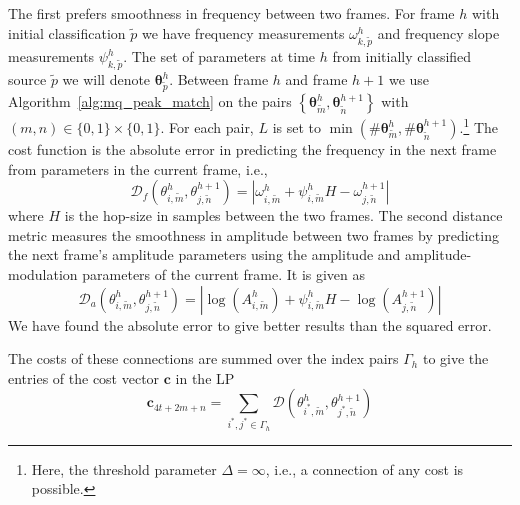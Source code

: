 The first prefers
smoothness in frequency between two frames. For frame $h$ with initial
classification $\tilde{p}$ we have frequency measurements
$\omega_{k,\tilde{p}}^{h}$
and frequency slope measurements $\psi_{k,\tilde{p}}^{h}$. The set of parameters
at time $h$ from initially classified source $\tilde{p}$ we will denote
$\boldsymbol{\theta}_{\tilde{p}}^{h}$. Between frame $h$ and frame $h+1$ we use
Algorithm~\ref{alg:mq_peak_match} on the pairs $\left\{ \boldsymbol{\theta}_{\tilde{m}}^{h},
\boldsymbol{\theta}_{\tilde{n}}^{h+1} \right\}$ with $(m,n) \in \{0,1\} \times
\{0,1\}$. For
each pair, $L$ is set to $\min(\# \boldsymbol{\theta}_{\tilde{m}}^{h} ,
\# \boldsymbol{\theta}_{\tilde{n}}^{h+1}).$\footnote{Here, the threshold parameter $\Delta
= \infty$, i.e., a connection of any cost is possible.} The cost function is the absolute error
in predicting the frequency in the next frame from parameters in the current
frame, i.e.,
\[
    \mathcal{D}_{f} \left( \theta_{i,\tilde{m}}^{h},
    \theta_{j,\tilde{n}}^{h+1} \right) = | \omega_{i,\tilde{m}}^{h} +
    \psi_{i,\tilde{m}}^{h} H - \omega_{j,\tilde{n}}^{h+1} |
\]
where $H$ is the hop-size in samples between the two frames.  The second
distance metric measures the smoothness in amplitude between two frames by
predicting the next frame's amplitude parameters using the amplitude and
amplitude-modulation parameters of the current frame.  It is given as
\[
    \mathcal{D}_{a} \left( \theta_{i,\tilde{m}}^{h},
    \theta_{j,\tilde{n}}^{h+1} \right) = | \log(A_{i,\tilde{m}}^{h}) +
    \psi_{i,\tilde{m}}^{h} H - \log(A_{j,\tilde{n}}^{h+1}) |
\]
We have found the absolute error to
give better results than the squared error.

The costs of these connections
are summed over the index pairs $\Gamma_{h}$ to give the entries of the cost
vector $\boldsymbol{c}$ in the LP
\[
    \boldsymbol{c}_{4t + 2m + n} = \sum_{i^{\ast},j^{\ast} \in \Gamma_{h}}
    \mathcal{D} \left( \theta_{i^{\ast},\tilde{m}}^{h}, \theta_{j^{\ast},\tilde{n}}^{h+1}
    \right)
\]

